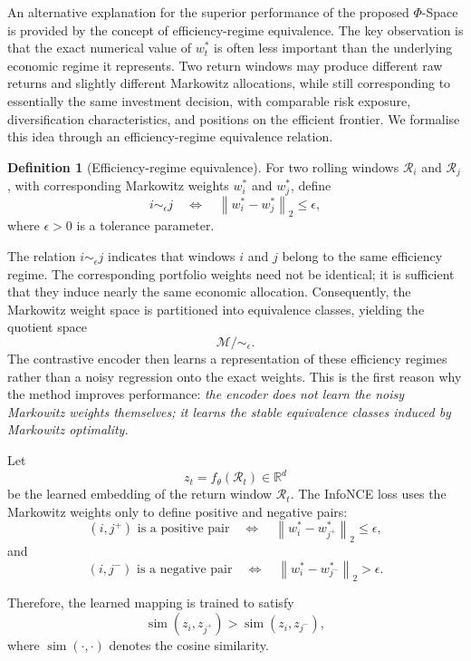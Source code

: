 \documentclass[preprint,12pt]{elsarticle}
\theoremstyle{plain}
\theoremstyle{definition}
\newtheorem{definition}[theorem]{Definition}
\newcommand{\norm}[1]{\left\|#1\right\|}
\begin{document}
An alternative explanation for the superior performance of the proposed $\Phi$-Space is provided by the concept of efficiency-regime equivalence. The key observation is that the exact numerical value of $w_t^*$ is often less important than the underlying economic regime it represents. Two return windows may produce different raw returns and slightly different Markowitz allocations, while still corresponding to essentially the same investment decision, with comparable risk exposure, diversification characteristics, and positions on the efficient frontier.
We formalise this idea through an efficiency-regime equivalence relation.

\begin{definition}[Efficiency-regime equivalence]
	For two rolling windows $\mathcal{R}_i$ and $\mathcal{R}_j$, with corresponding Markowitz weights
	$w_i^*$ and $w_j^*$, define
	\begin{equation}
		i \sim_\epsilon j
		\quad\Longleftrightarrow\quad
		\norm{w_i^*-w_j^*}_2 \leq \epsilon,
		\label{eq:efficiency_equivalence}
	\end{equation}
	where $\epsilon>0$ is a tolerance parameter.
\end{definition}

The relation $i\sim_\epsilon j$ indicates that windows $i$ and $j$ belong to the same efficiency regime. The corresponding portfolio weights need not be identical; it is sufficient that they induce nearly the same economic allocation. Consequently, the Markowitz weight space is partitioned into equivalence classes, yielding the quotient space
\[
\mathcal{M}
\big/\!\sim_{\epsilon}.
\]
The contrastive encoder then learns a representation of these efficiency regimes rather than a noisy regression onto the exact weights.
This is the first reason why the method improves performance: \emph{the encoder does not learn the noisy Markowitz weights themselves; it learns the stable equivalence classes induced by Markowitz optimality.}

\label{subsec:infonce_metric_learning}
Let
\[
z_t=f_\theta(\mathcal{R}_t)\in\mathbb{R}^d
\]
be the learned embedding of the return window $\mathcal{R}_t$. The InfoNCE loss uses the Markowitz weights only to define positive and negative pairs:
\[
(i,j^+) \text{ is a positive pair}
\quad\Longleftrightarrow\quad
\norm{w_i^*-w_{j^+}^*}_2\le \epsilon,
\]
and
\[
(i,j^-) \text{ is a negative pair}
\quad\Longleftrightarrow\quad
\norm{w_i^*-w_{j^-}^*}_2>\epsilon.
\]

Therefore, the learned mapping is trained to satisfy
\[
\operatorname{sim}(z_i,z_{j^+})
>
\operatorname{sim}(z_i,z_{j^-}),
\]
where $\operatorname{sim}(\cdot,\cdot)$ denotes the cosine similarity.
\end{document}

